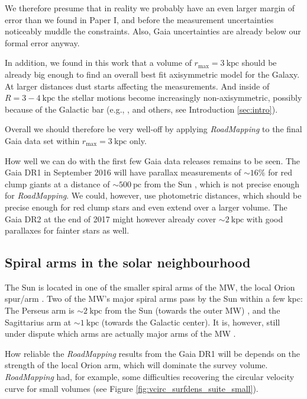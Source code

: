 \documentclass[iop,revtex4,numberedappendix,appendixfloats]{emulateapj}
\newcommand{\RM}{{\sl RoadMapping}}
\begin{document}
We therefore presume that in reality we probably have an even larger margin of error than we found in Paper I, and before the measurement uncertainties noticeably muddle the constraints. Also, Gaia uncertainties are already below our formal error anyway.

In addition, we found in this work that a volume of $r_\text{max} = 3~\text{kpc}$ should be already big enough to find an overall best fit axisymmetric model for the Galaxy. At larger distances dust starts affecting the measurements. And inside of $R=3-4~\text{kpc}$ the stellar motions become increasingly non-axisymmetric, possibly because  of the Galactic bar (e.g., \citealt{2014ApJ...783..130R,2015ApJ...800...83B}, and others, see Introduction \ref{sec:intro}).

Overall we should therefore be very well-off by applying \RM{} to the final Gaia data set within $r_\text{max}=3~\text{kpc}$ only.

How well we can do with the first few Gaia data releases remains to be seen. The Gaia DR1 in September 2016 will have parallax measurements of $\sim16\%$ for red clump giants at a distance of $\sim 500~\text{pc}$ from the Sun \citep{2014EAS....67...23D,2015A&A...574A.115M}, which is not precise enough for \RM{}. We could, however, use photometric distances, which should be precise enough for red clump stars and even extend over a larger volume. The Gaia DR2 at the end of 2017 might however already cover $\sim 2~\text{kpc}$ with good parallaxes for fainter stars as well.

\subsection{Spiral arms in the solar neighbourhood} \label{sec:discussion_sun_location}

The Sun is located in one of the smaller spiral arms of the MW, the local Orion spur/arm \citep{1953ApJ...118..318M}. Two of the MW's major spiral arms pass by the Sun within a few kpc: The Perseus arm is $\sim2~\text{kpc}$ from the Sun (towards the outer MW) \citep{2006Sci...311...54X}, and the Sagittarius arm at $\sim1~\text{kpc}$ \citep{2010PASJ...62..287S} (towards the Galactic center). It is, however, still under dispute which arms are actually major arms of the MW \citep{1985IAUS..106..335B,2013ApJ...769...15X,2013ApJ...775...79Z}.

How reliable the \RM{} results from the Gaia DR1 will be depends on the strength of the local Orion arm, which will dominate the survey volume. \RM{} had, for example, some difficulties recovering the circular velocity curve for small volumes (see Figure \ref{fig:vcirc_surfdens_suite_small}).
\end{document}
